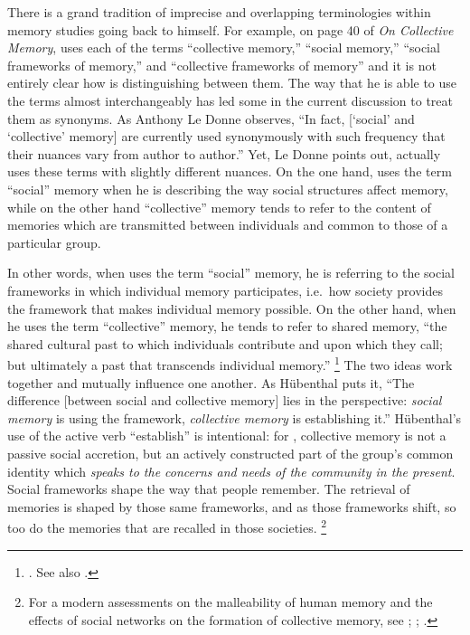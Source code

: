 There is a grand tradition of imprecise and overlapping terminologies within memory studies going back to \halbwachs himself. For example, on page 40 of \emph{On Collective Memory}, \halbwachs uses each of the terms ``collective memory,'' ``social memory,'' ``social frameworks of memory,'' and ``collective frameworks of memory'' and it is not entirely clear how \halbwachs is distinguishing between them. The way that he is able to use the terms almost interchangeably has led some in the current discussion to treat them as synonyms. As Anthony Le Donne observes, ``In fact, {[}`social' and `collective' memory{]} are currently used synonymously with such frequency that their nuances vary from author to author.''%
    \autocite[42 n.8]{ledonne2009}
Yet, Le Donne points out, \halbwachs actually uses these terms with slightly different nuances. On the one hand, \halbwachs uses the term ``social'' memory when he is describing the way social structures affect memory, while on the other hand ``collective'' memory tends to refer to the content of memories which are transmitted between individuals and common to those of a particular group.  

In other words, when \halbwachs uses the term ``social'' memory, he is referring to the social frameworks in which individual memory participates, i.e.~how society provides the framework that makes individual memory possible.%
    \autocite[180]{hubenthal_carstens-hasselbalch2012}
On the other hand, when he uses the term ``collective'' memory, he tends to refer to shared memory, ``the shared cultural past to which individuals contribute and upon which they call; but ultimately a past that transcends individual memory.''%
    \footnote{%
        \Cite[360]{keith_ec2015}. See also 
        \cite[180]{hubenthal_carstens-hasselbalch2012}.}
The two ideas work together and mutually influence one another. As Hübenthal puts it, ``The difference [between social and collective memory] lies in the perspective: \emph{social memory} is using the framework, \emph{collective memory} is establishing it.''%
    \autocite[180.]{hubenthal_carstens-hasselbalch2012}
Hübenthal's use of the active verb ``establish'' is intentional: for \halbwachs, collective memory is not a passive social accretion, but an actively constructed part of the group's common identity which \emph{speaks to the concerns and needs of the community in the present}. Social frameworks shape the way that people remember. The retrieval of memories is shaped by those same frameworks, and as those frameworks shift, so too do the memories that are recalled in those societies.%
    \footnote{%
        For a modern assessments on the malleability of human memory and the effects of social networks on the formation of collective memory, see 
        \cite{coman-etal_pnas2016}; 
        \cite{yamashiro-hirst_jarmc2014}; 
        \cite{coman-etal_yang-etal2012}.}

